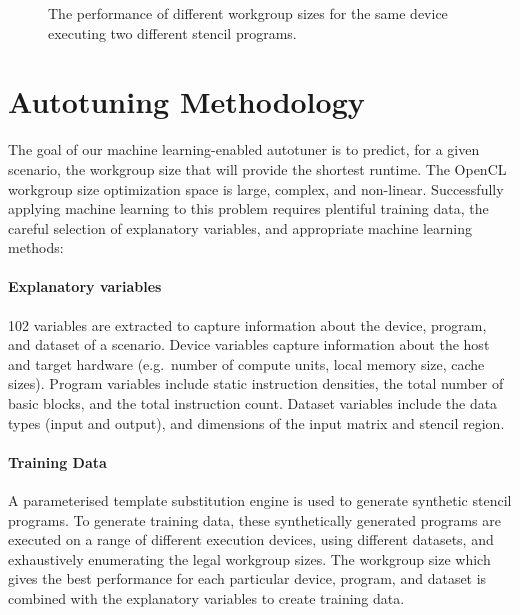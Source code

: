 \documentclass[hidelinks]{acaces}
\DeclareMathOperator*{\argmin}{arg\,min}
\begin{document}
\begin{figure}
{\begin{minipage}{.48\textwidth}
\begin{subfigure}[h]{.48\columnwidth}
      \vspace{-1.5em} %
      \caption{}
      \label{fig:motivation-4}
    \end{subfigure}
    \caption{%
      The performance of different workgroup sizes for the same device
      executing two different stencil programs.%
    }
    \label{fig:motivation-prog}
  \end{minipage}%
}
\end{figure}


\section{Autotuning Methodology}

The goal of our machine learning-enabled autotuner is to predict, for
a given scenario, the workgroup size that will provide the shortest
runtime.
%
The OpenCL workgroup size optimization space is large, complex, and
non-linear. Successfully applying machine learning to this problem
requires plentiful training data, the careful selection of explanatory
variables, and appropriate machine learning methods:
%
\vspace{-1.2em}
\paragraph{Explanatory variables} 102 variables are extracted to
capture information about the device, program, and dataset of a
scenario. Device variables capture information about the host and
target hardware (e.g.\ number of compute units, local memory size,
cache sizes). Program variables include static instruction densities,
the total number of basic blocks, and the total instruction
count. Dataset variables include the data types (input and output),
and dimensions of the input matrix and stencil region.
%
\vspace{-1.2em}
\paragraph{Training Data} A parameterised template substitution engine
is used to generate synthetic stencil programs. To generate training
data, these synthetically generated programs are executed on a range
of different execution devices, using different datasets, and
exhaustively enumerating the legal workgroup sizes. The workgroup size
which gives the best performance for each particular device, program,
and dataset is combined with the explanatory variables to create
training data.
%
\vspace{-1.2em}
\end{document}
